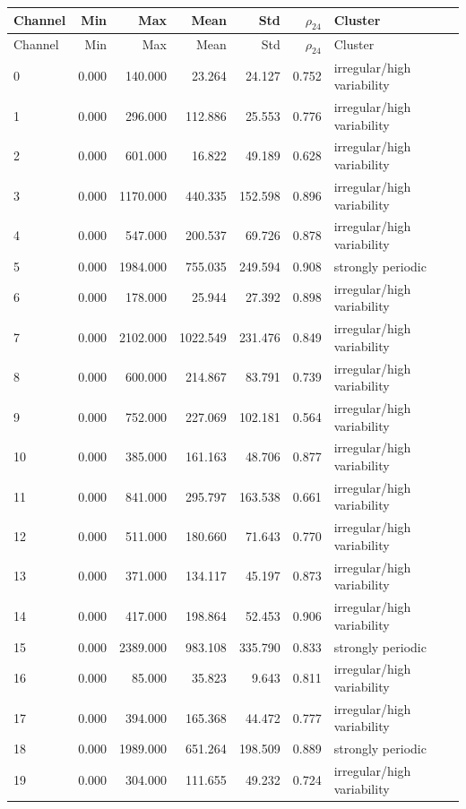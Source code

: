 \begin{longtable}{lrrrrrl}
\toprule
Channel & Min & Max & Mean & Std & $\rho_{24}$ & Cluster \\
\midrule
\endfirsthead
\toprule
Channel & Min & Max & Mean & Std & $\rho_{24}$ & Cluster \\
\midrule
\endhead
0 & 0.000 & 140.000 & 23.264 & 24.127 & 0.752 & irregular/high variability \\
1 & 0.000 & 296.000 & 112.886 & 25.553 & 0.776 & irregular/high variability \\
2 & 0.000 & 601.000 & 16.822 & 49.189 & 0.628 & irregular/high variability \\
3 & 0.000 & 1170.000 & 440.335 & 152.598 & 0.896 & irregular/high variability \\
4 & 0.000 & 547.000 & 200.537 & 69.726 & 0.878 & irregular/high variability \\
5 & 0.000 & 1984.000 & 755.035 & 249.594 & 0.908 & strongly periodic \\
6 & 0.000 & 178.000 & 25.944 & 27.392 & 0.898 & irregular/high variability \\
7 & 0.000 & 2102.000 & 1022.549 & 231.476 & 0.849 & irregular/high variability \\
8 & 0.000 & 600.000 & 214.867 & 83.791 & 0.739 & irregular/high variability \\
9 & 0.000 & 752.000 & 227.069 & 102.181 & 0.564 & irregular/high variability \\
10 & 0.000 & 385.000 & 161.163 & 48.706 & 0.877 & irregular/high variability \\
11 & 0.000 & 841.000 & 295.797 & 163.538 & 0.661 & irregular/high variability \\
12 & 0.000 & 511.000 & 180.660 & 71.643 & 0.770 & irregular/high variability \\
13 & 0.000 & 371.000 & 134.117 & 45.197 & 0.873 & irregular/high variability \\
14 & 0.000 & 417.000 & 198.864 & 52.453 & 0.906 & irregular/high variability \\
15 & 0.000 & 2389.000 & 983.108 & 335.790 & 0.833 & strongly periodic \\
16 & 0.000 & 85.000 & 35.823 & 9.643 & 0.811 & irregular/high variability \\
17 & 0.000 & 394.000 & 165.368 & 44.472 & 0.777 & irregular/high variability \\
18 & 0.000 & 1989.000 & 651.264 & 198.509 & 0.889 & strongly periodic \\
19 & 0.000 & 304.000 & 111.655 & 49.232 & 0.724 & irregular/high variability \\

\end{longtable}
